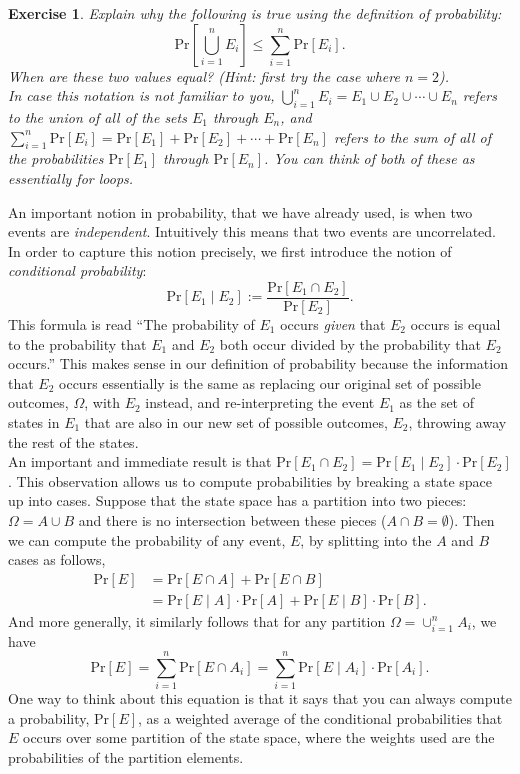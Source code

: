 \documentclass[12pt]{article}
\newcommand{\pr}[1]{\text{Pr}\left[#1\right]}
\newtheorem{exercise}{Exercise}
\theoremstyle{definition}
\theoremstyle{remark}
\theoremstyle{definition}
\begin{document}
\begin{exercise}
Explain why the following is true using the definition of probability: $$\pr{\bigcup_{i=1}^n E_i}\leq \sum_{i=1}^n\pr{E_i}.$$ When are these two values equal? (Hint: first try the case where $n=2$).\\

In case this notation is not familiar to you, $\bigcup_{i=1}^n E_i = E_1\cup E_2\cup\cdots\cup E_n$ refers to the union of all of the sets $E_1$ through $E_n$, and $\sum_{i=1}^n\pr{E_i} = \pr{E_1} + \pr{E_2} + \cdots + \pr{E_n}$ refers to the sum of all of the probabilities $\pr{E_1}$ through $\pr{E_n}$. You can think of both of these as essentially for loops.
\end{exercise}

An important notion in probability, that we have already used, is when two events are \emph{independent}. Intuitively this means that two events are uncorrelated. In order to capture this notion precisely, we first introduce the notion of \emph{conditional probability}: $$\pr{E_1\mid E_2} := \frac{\pr{E_1\cap E_2}}{\pr{E_2}}.$$ This formula is read ``The probability of $E_1$ occurs \emph{given} that $E_2$ occurs is equal to the probability that $E_1$ and $E_2$ both occur divided by the probability that $E_2$ occurs.'' This makes sense in our definition of probability because the information that $E_2$ occurs essentially is the same as replacing our original set of possible outcomes, $\Omega$, with $E_2$ instead, and re-interpreting the event $E_1$ as the set of states in $E_1$ that are also in our new set of possible outcomes, $E_2$, throwing away the rest of the states.\\

An important and immediate result is that $\pr{E_1\cap E_2} = \pr{E_1\mid E_2}\cdot \pr{E_2}$. This observation allows us to compute probabilities by breaking a state space up into cases. Suppose that the state space has a partition into two pieces: $\Omega = A\cup B$ and there is no intersection between these pieces ($A\cap B = \emptyset$). Then we can compute the probability of any event, $E$, by splitting into the $A$ and $B$ cases as follows,
\begin{align*}
\pr{E} &=  \pr{E\cap A} + \pr{E\cap B}\\
&= \pr{E\mid A}\cdot \pr{A} + \pr{E\mid B}\cdot\pr{B}.
\end{align*}
And more generally, it similarly follows that for any partition $\Omega = \cup_{i=1}^nA_i$, we have $$\pr{E} = \sum_{i=1}^n\pr{E\cap A_i} = \sum_{i=1}^n\pr{E\mid A_i}\cdot \pr{A_i}.$$
One way to think about this equation is that it says that you can always compute a probability, $\pr{E}$, as a weighted average of the conditional probabilities that $E$ occurs over some partition of the state space, where the weights used are the probabilities of the partition elements.\\
\end{document}
